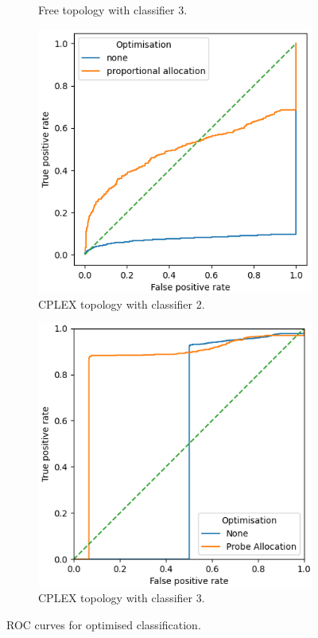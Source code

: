\begin{figure}[H]
\begin{subfigure}[H]{0.475\textwidth}
        \caption{Free topology with classifier 3.}
    \end{subfigure}
    \begin{subfigure}[H]{0.475\textwidth}
        \includegraphics[width=\textwidth]{figs/results/norway_ac2_opt.png}
        \caption{CPLEX topology with classifier 2.}
    \end{subfigure}
    \begin{subfigure}[H]{0.475\textwidth}
        \includegraphics[width=\textwidth]{figs/results/norway_ac3_opt.png}
        \caption{CPLEX topology with classifier 3.}
    \end{subfigure}
    \caption{ROC curves for optimised classification.}
    \label{fig:RprobeoptROCcurves}
\end{figure}

